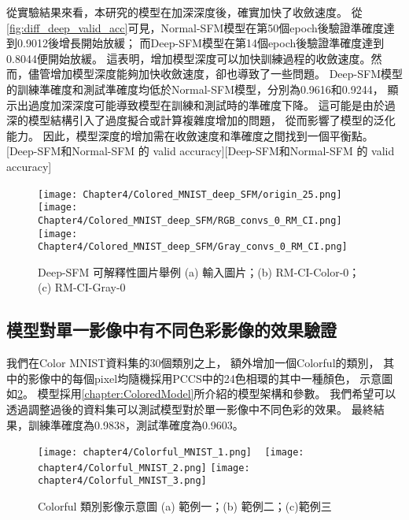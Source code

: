 \documentclass[class=NCU\_thesis, crop=false]{standalone}
\begin{document}
    從實驗結果來看，本研究的模型在加深深度後，確實加快了收斂速度。
    從\cref{fig:diff_deep_valid_acc}可見，Normal-SFM模型在第50個epoch後驗證準確度達到0.9012後增長開始放緩；
    而Deep-SFM模型在第14個epoch後驗證準確度達到0.8044便開始放緩。
    這表明，增加模型深度可以加快訓練過程的收斂速度。然
    而，儘管增加模型深度能夠加快收斂速度，卻也導致了一些問題。
    Deep-SFM模型的訓練準確度和測試準確度均低於Normal-SFM模型，分別為0.9616和0.9244，
    顯示出過度加深深度可能導致模型在訓練和測試時的準確度下降。
    這可能是由於過深的模型結構引入了過度擬合或計算複雜度增加的問題，
    從而影響了模型的泛化能力。
    因此，模型深度的增加需在收斂速度和準確度之間找到一個平衡點。
    [Deep-SFM和Normal-SFM 的 valid accuracy][Deep-SFM和Normal-SFM 的 valid accuracy]


    \begin{figure}[H]
        \centering
        \subcaptionbox
            {}
            {\texttt{[image: Chapter4/Colored\_MNIST\_deep\_SFM/origin\_25.png]}}
        ~
        \subcaptionbox
            {}
            {\texttt{[image: Chapter4/Colored\_MNIST\_deep\_SFM/RGB\_convs\_0\_RM\_CI.png]}}
        \subcaptionbox
            {}
            {\texttt{[image: Chapter4/Colored\_MNIST\_deep\_SFM/Gray\_convs\_0\_RM\_CI.png]}}
        \caption{Deep-SFM 可解釋性圖片舉例 (a) 輸入圖片；(b) RM-CI-Color-0；(c) RM-CI-Gray-0}
        \label{fig:deep-SFM-example}
    \end{figure}

    \subsection{模型對單一影像中有不同色彩影像的效果驗證}
    我們在Color MNIST資料集的30個類別之上，
    額外增加一個Colorful的類別，
    其中的影像中的每個pixel均隨機採用PCCS中的24色相環的其中一種顏色，
    示意圖如\cref{fig:Colorful_Images}。
    模型採用\cref{chapter:ColoredModel}所介紹的模型架構和參數。
    我們希望可以透過調整過後的資料集可以測試模型對於單一影像中不同色彩的效果。
    最終結果，訓練準確度為0.9838，測試準確度為0.9603。

    \begin{figure}[H]
        \centering
        \subcaptionbox
            {}
            {\texttt{[image: chapter4/Colorful\_MNIST\_1.png]}}
        ~
        \subcaptionbox
            {}
            {\texttt{[image: chapter4/Colorful\_MNIST\_2.png]}}
        \subcaptionbox
            {}
            {\texttt{[image: chapter4/Colorful\_MNIST\_3.png]}}
        \caption{Colorful 類別影像示意圖 (a) 範例一；(b) 範例二；(c)範例三}
        \label{fig:Colorful_Images}
    \end{figure}
\end{document}

